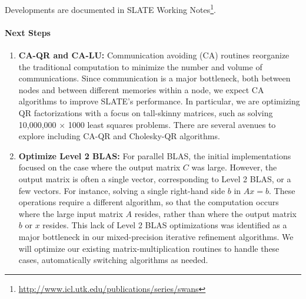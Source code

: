 \noindent
Developments are documented in SLATE Working Notes\footnote{
\url{http://www.icl.utk.edu/publications/series/swans}}.

\paragraph{Next Steps}

\begin{enumerate}

\item \textbf{CA-QR and CA-LU:}
Communication avoiding (CA) routines reorganize the traditional computation
to minimize the number and volume of communications.
Since communication is a major
bottleneck, both between nodes and between different memories within a node,
we expect CA algorithms to improve SLATE's performance.
In particular, we are optimizing QR factorizations with a focus on tall-skinny
matrices, such as solving 10,000,000 $\times$ 1000
least squares problems. There are several avenues to explore including
CA-QR and Cholesky-QR algorithms.

\item \textbf{Optimize Level 2 BLAS:}
For parallel BLAS, the initial implementations focused on the case where
the output matrix $C$ was large. However, the output matrix is often a
single vector, corresponding to Level 2 BLAS, or a few vectors.
For instance, solving a
single right-hand side $b$ in $Ax = b$. These operations require a different
algorithm, so that the computation occurs where the large input matrix $A$
resides, rather than where the output matrix $b$ or $x$ resides. This
lack of Level 2 BLAS optimizations was identified as a major bottleneck
in our mixed-precision iterative refinement algorithms. We will optimize
our existing matrix-multiplication routines to handle these cases,
automatically switching algorithms as needed.

\end{enumerate}
